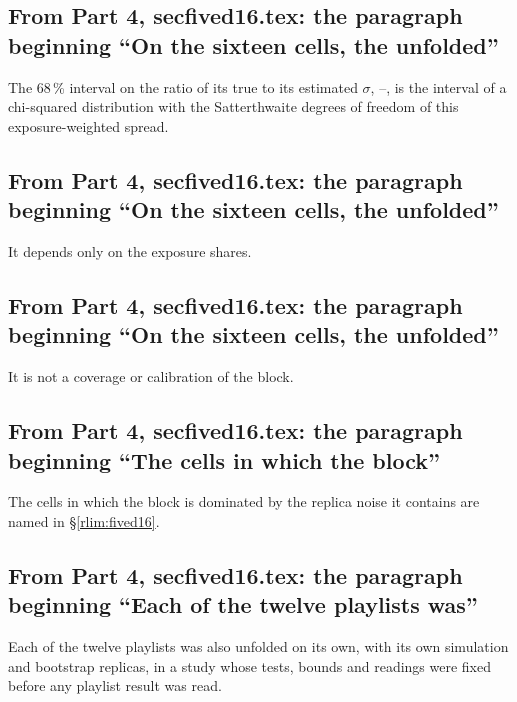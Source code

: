 \subsection{From Part 4, secfived16.tex: the paragraph beginning ``On the sixteen cells, the unfolded''}
The 68\,\% interval on the ratio of its true to its estimated $\sigma$, --, is the interval of a chi-squared distribution with the Satterthwaite degrees of freedom of this exposure-weighted spread.

\subsection{From Part 4, secfived16.tex: the paragraph beginning ``On the sixteen cells, the unfolded''}
It depends only on the exposure shares.

\subsection{From Part 4, secfived16.tex: the paragraph beginning ``On the sixteen cells, the unfolded''}
It is not a coverage or calibration of the block.

\subsection{From Part 4, secfived16.tex: the paragraph beginning ``The cells in which the block''}
The cells in which the block is dominated by the replica noise it contains are named in \S\ref{rlim:fived16}.

\subsection{From Part 4, secfived16.tex: the paragraph beginning ``Each of the twelve playlists was''}
Each of the twelve playlists was also unfolded on its own, with its own simulation and bootstrap replicas, in a study whose tests, bounds and readings were fixed before any playlist result was read.

